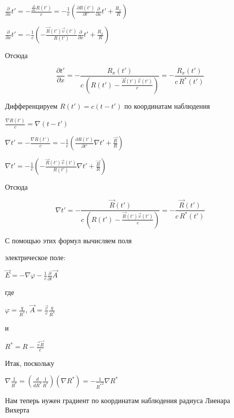 \documentclass[11pt]{article}
\begin{document}
\(\frac{\partial}{\partial x} t' = -\frac{\frac{\partial}{\partial x} R\left(t'\right)}{c} = - \frac{1}{c}\left(\frac{\partial R\left(t'\right)}{\partial t'} \frac{\partial}{\partial x} t' + \frac{R_x}{R}\right)\)

    \(\frac{\partial}{\partial x} t' = - \frac{1}{c}\left(-\frac{\vec R\left(t'\right)\vec v\left(t'\right)}{R\left(t'\right)} \frac{\partial}{\partial x} t' + \frac{R_x}{R}\right)\)

Отсюда

\[\frac{\partial  t'}{\partial x} = - \frac{R_x\left(t'\right)}{c\,\left(R\left(t'\right) -\frac{\vec R\left(t'\right)\vec v\left(t'\right)}{c}\right)} = - \frac{R_x\left(t'\right)}{c\,{{R}^{*}}\left(t'\right)}\]

    Дифференцируем \(R\left(t'\right) = c \left(t-t'\right)\) по координатам
наблюдения

\(\frac{\nabla R\left(t'\right)}{c} = \nabla \left(t-t'\right)\)

\(\nabla t' = -\frac{\nabla R\left(t'\right)}{c} = - \frac{1}{c}\left(\frac{\partial R\left(t'\right)}{\partial t'} \nabla t' + \frac{\vec R}{R}\right)\)

    \(\nabla t' = - \frac{1}{c}\left(-\frac{\vec R\left(t'\right)\vec v\left(t'\right)}{R\left(t'\right)} \nabla t' + \frac{\vec R}{R}\right)\)

Отсюда

\[\nabla t' = - \frac{\vec R\left(t'\right)}{c\,\left(R\left(t'\right) -\frac{\vec R\left(t'\right)\vec v\left(t'\right)}{c}\right)}  = - \frac{\vec R\left(t'\right)}{c\,{{R}^{*}}\left(t'\right)}\]

    С помощью этих формул вычисляем поля

электрическое поле:

\(\vec{E} = -\nabla\varphi - \frac{1}{c}\frac{\partial}{\partial t}\vec{A}\)

где

\(\varphi=\frac{q}{{R}^{*}}\),
\(\vec{A}=\frac{\vec{v}}{c}\frac{q}{{R}^{*}}\)

и

\({R}^{*} = R - \frac{\vec{v}\vec{R}}{c}\)

Итак, поскольку

\(\nabla\frac{1}{{{R}^{*}}} = \left(\frac{d}{d{{R}^{*}}}\frac{1}{{{R}^{*}}}\right)\left(\nabla {{R}^{*}}\right) = -\frac{1}{{{R}^{*}}^2}\nabla {{R}^{*}}\)

    Нам теперь нужен градиент по координатам наблюдения радиуса Лиенара
Вихерта
\end{document}
